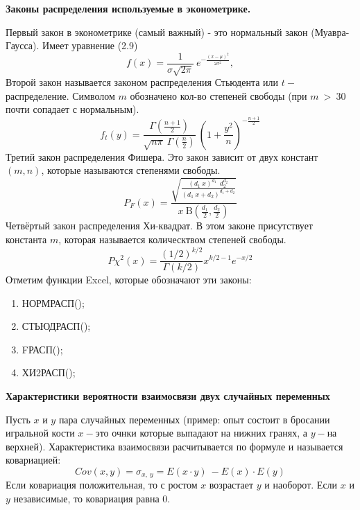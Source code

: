 \documentclass[12pt,a4paper]{article}
\begin{document}
\begin{center}
\textbf{Законы распределения используемые в эконометрике.}

Первый закон в эконометрике (самый важный) - это нормальный закон (Муавра-Гаусса). Имеет уравнение (2.9)
\begin{equation*}
{\displaystyle f(x)=\frac{1}{\sigma \sqrt{2\pi }} \ e^{-\frac{(x-\mu )^{2}}{2\sigma ^{2}}} ,}
\end{equation*}
Второй закон называется законом распределения Стьюдента или $\displaystyle t-$распределение. Символом $\displaystyle m$ обозначено кол-во степеней свободы (при $\displaystyle m\  >\ 30$ почти сопадает с нормальным).
\begin{equation*}
{\displaystyle f_{t} (y)=\frac{\Gamma \left(\frac{n+1}{2}\right)}{\sqrt{n\pi } \ \Gamma \left(\frac{n}{2}\right)} \ \left( 1+\frac{y^{2}}{n}\right)^{-\frac{n+1}{2}}}
\end{equation*}
Третий закон распределения Фишера. Это закон зависит от двух констант $\displaystyle ( m,n)$, которые называются степенями свободы.
\begin{equation*}
{\displaystyle P_{F}( x) =\frac{\sqrt{\frac{(d_{1} \ x)^{d_{1}} \ \ d^{d_{2}}_{2}}{(d_{1} \ x+d_{2} )^{d_{1} +d_{2}}}}}{x\ \mathrm{B}\left(\frac{d_{1}}{2} ,\frac{d_{2}}{2}\right)}}
\end{equation*}
Четвёртый закон распределения Хи-квадрат. В этом законе присутствует константа $\displaystyle m$, которая называется колическтвом степеней свободы.
\begin{equation*}
{\displaystyle P\chi ^{2}( x) =\frac{(1/2)^{k/2}}{\Gamma (k/2)} x^{k/2-1} e^{-x/2}}
\end{equation*}
Отметим функции Excel, которые обозначают эти законы:
\begin{enumerate}
\item НОРМРАСП();
\item СТЬЮДРАСП();
\item FРАСП();
\item ХИ2РАСП();
\end{enumerate}
\begin{center}
\textbf{Характеристики вероятности взаимосвязи двух случайных переменных}
\end{center}
Пусть $\displaystyle x$ и $\displaystyle y$ пара случайных переменных (пример: опыт состоит в бросании игральной кости $\displaystyle x-$это очнки которые выпадают на нижних гранях, а $\displaystyle y-$на верхней). Характеристика взаимосвязи расчитывается по формуле и называется ковариацией:
\begin{equation*}
Cov( x,y) =\sigma _{x,\ y} =E( x\cdot y) \ -E( x) \cdot E( y)
\end{equation*}
Если ковариация положительная, то с ростом $\displaystyle x$ возрастает $\displaystyle y$ и наоборот. Если $\displaystyle x$ и $\displaystyle y$ независимые, то ковариация равна 0.


\end{center}
\end{document}
